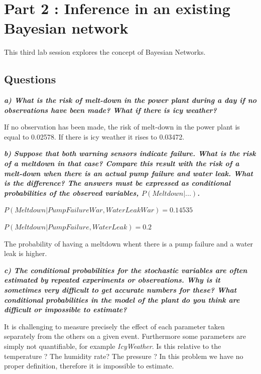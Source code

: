   \section*{Part 2 : Inference in an existing Bayesian network}
 \thispagestyle{empty}

This third lab session explores the concept of Bayesian Networks.

\subsection*{Questions}


\textit{\textbf{a) What is the risk of melt-down in the power plant during a day if no
observations have been made? What if there is icy weather?}}

\vspace{1em}

If no observation has been made, the risk of melt-down in the power plant is
equal to 0.02578. If there is icy weather it rises to 0.03472.

\textit{\textbf{b) Suppose that both warning sensors indicate failure. What is the risk
of a meltdown in that case? Compare this result with the risk of a melt-down
when there is an actual pump failure and water leak. What is the difference?
The answers must be expressed as conditional probabilities of the observed
variables, $P(Meltdown|...)$.}}

\vspace{1em}

$P(Meltdown| PumpFailureWar,WaterLeakWar) = 0.14535$

$P(Meltdown| PumpFailure,WaterLeak) = 0.2$

The probability of having a meltdown whent there is a pump failure and a water
leak is higher.

\textit{\textbf{c) The conditional probabilities for the stochastic variables are often
estimated by repeated experiments or observations. Why is it sometimes very
difficult to get accurate numbers for these? What conditional probabilities
in the model of the plant do you think are difficult or impossible to estimate?}}

\vspace{1em}


It is challenging to measure precisely the effect of each parameter taken separately
from the others on a given event. Furthermore some parameters are simply not
quantifiable, for example \textit{IcyWeather}. Is this relative to the temperature ?
The humidity rate? The pressure ? In this problem we have no proper definition,
therefore it is impossible to estimate.

